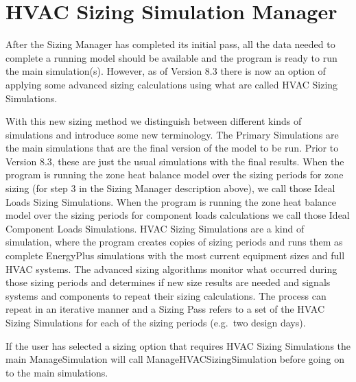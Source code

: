 \section{HVAC Sizing Simulation Manager}\label{hvac-sizing-simulation-manager}

After the Sizing Manager has completed its initial pass, all the data needed to complete a running model should be available and the program is ready to run the main simulation(s). However, as of Version 8.3 there is now an option of applying some advanced sizing calculations using what are called HVAC Sizing Simulations.

With this new sizing method we distinguish between different kinds of simulations and introduce some new terminology. The Primary Simulations are the main simulations that are the final version of the model to be run. Prior to Version 8.3, these are just the usual simulations with the final results. When the program is running the zone heat balance model over the sizing periods for zone sizing (for step 3 in the Sizing Manager description above), we call those Ideal Loads Sizing Simulations. When the program is running the zone heat balance model over the sizing periods for component loads calculations we call those Ideal Component Loads Simulations. HVAC Sizing Simulations are a kind of simulation, where the program creates copies of sizing periods and runs them as complete EnergyPlus simulations with the most current equipment sizes and full HVAC systems. The advanced sizing algorithms monitor what occurred during those sizing periods and determines if new size results are needed and signals systems and components to repeat their sizing calculations. The process can repeat in an iterative manner and a Sizing Pass refers to a set of the HVAC Sizing Simulations for each of the sizing periods (e.g.~two design days).

If the user has selected a sizing option that requires HVAC Sizing Simulations the main ManageSimulation will call ManageHVACSizingSimulation before going on to the main simulations.

